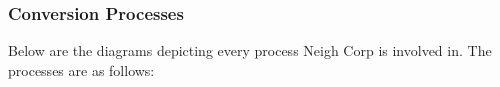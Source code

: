 \documentclass{article}
\begin{document}
\subsubsection{Conversion Processes}

Below are the diagrams depicting every process Neigh Corp is involved in. The processes are as follows:
    \clearpage
\end{document}

